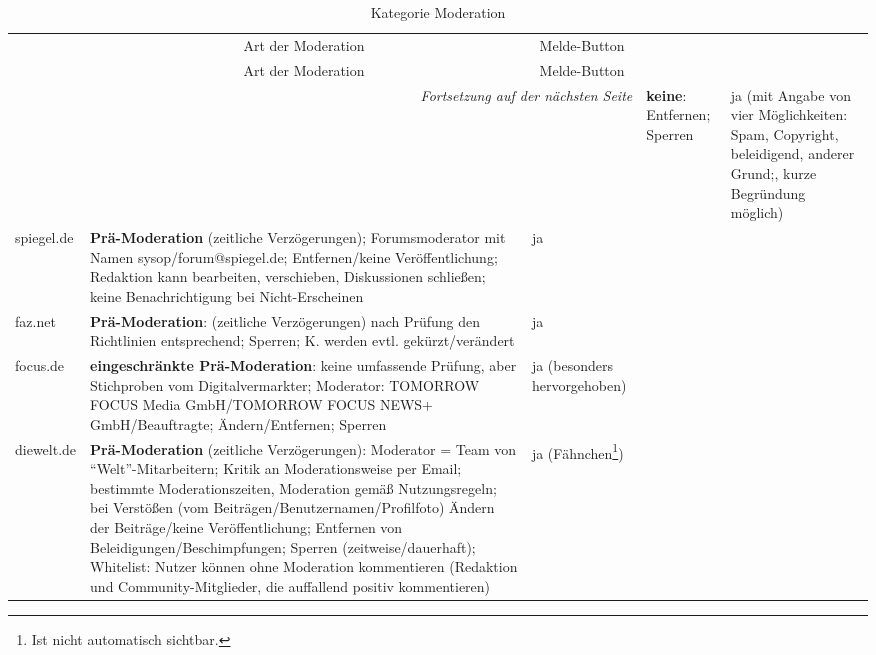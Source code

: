 
\begin{landscape} \footnotesize
\begin{longtable}{lp{110mm}p{50mm}}
  \caption{Kategorie Moderation} \\ \\

  \toprule
  \multicolumn{1}{c}{} &
  \multicolumn{1}{c}{Art der Moderation} &
  \multicolumn{1}{c}{Melde-Button} \\\midrule[\heavyrulewidth]
  \endfirsthead

  \toprule
  \multicolumn{1}{c}{} &
  \multicolumn{1}{c}{Art der Moderation} &
  \multicolumn{1}{c}{Melde-Button} \\\midrule[\heavyrulewidth]
  \endhead

  \multicolumn{3}{r}{\emph{Fortsetzung auf der nächsten Seite}}
  \endfoot

  \bottomrule
  \endlastfoot

bild.de &
  {\bfseries keine}: Entfernen; Sperren &
  ja (mit Angabe von vier Möglichkeiten: Spam, Copyright, beleidigend, anderer
  Grund;, kurze Begründung möglich) \\\midrule

spiegel.de &
   {\bfseries Prä-Moderation} (zeitliche Verzögerungen); Forumsmoderator mit Namen
  sysop/forum@spiegel.de; Entfernen/keine Veröffentlichung; Redaktion kann
  bearbeiten, verschieben, Diskussionen schließen; keine Benachrichtigung bei
  Nicht-Erscheinen &
  ja \\\midrule

faz.net &
   {\bfseries Prä-Moderation}: (zeitliche Verzögerungen) nach Prüfung den Richtlinien
  entsprechend; Sperren; K. werden evtl. gekürzt/verändert &
  ja \\\midrule

focus.de &
   {\bfseries eingeschränkte Prä-Moderation}: keine umfassende Prüfung, aber Stichproben vom
  Digitalvermarkter; Moderator: TOMORROW FOCUS Media GmbH/TOMORROW FOCUS NEWS+
  GmbH/Beauftragte; Ändern/Entfernen; Sperren &
  ja (besonders hervorgehoben) \\\midrule

diewelt.de &
   {\bfseries Prä-Moderation} (zeitliche Verzögerungen): Moderator = Team von
  ``Welt''-Mitarbeitern; Kritik an Moderationsweise per Email; bestimmte
  Moderationszeiten, Moderation gemäß Nutzungsregeln; bei Verstößen (vom
  Beiträgen/Benutzernamen/Profilfoto) Ändern der Beiträge/keine
  Veröffentlichung; Entfernen von Beleidigungen/Beschimpfungen; Sperren
  (zeitweise/dauerhaft); Whitelist: Nutzer können ohne Moderation kommentieren
  (Redaktion und Community-Mitglieder, die auffallend positiv kommentieren) &
  ja (Fähnchen\footnote{Ist nicht automatisch sichtbar.}) \\\midrule


\end{longtable}
\end{landscape}
